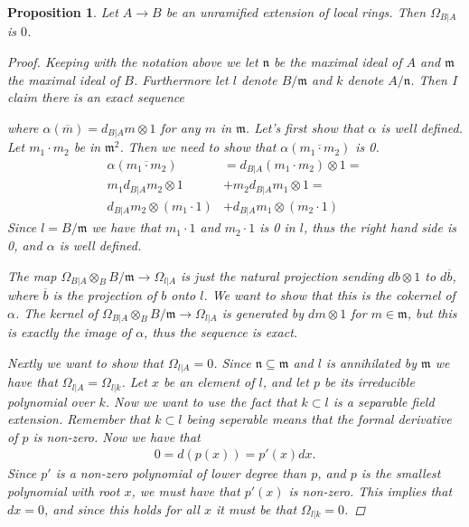 \documentclass[11pt, a4paper, english]{article}
\newtheorem{prop}{Proposition}
\numberwithin{prop}{section}
\numberwithin{lemma}{section}
\numberwithin{theorem}{section}
\numberwithin{defin}{section}
\numberwithin{example}{section}
\begin{document}
\begin{prop}
Let $A \to B$ be an unramified extension of local rings. Then $\Omega_{B|A}$ is $0$.

\begin{proof}
Keeping with the notation above we let $\mathfrak{n}$ be the maximal ideal of $A$ and $\mathfrak{m}$ the maximal ideal of $B$. Furthermore let $l$ denote $B/\mathfrak{m}$ and $k$ denote $A/\mathfrak{n}$. Then I claim there is an exact sequence
\begin{center}
\end{center}
where $\alpha(\overline{m}) = d_{B|A}m \otimes 1$ for any $m$ in $\mathfrak{m}$. Let's first show that $\alpha$ is well defined. Let $m_1 \cdot m_2$ be in $\mathfrak{m}^2$. Then we need to show that $\alpha(\overline{m_1 \cdot m_2})$ is 0. 
\begin{align*}
\alpha(\overline{m_1 \cdot m_2}) &= d_{B|A}(m_1 \cdot m_2) \otimes 1 =\\ 
m_1 d_{B|A}m_2 \otimes 1 &+ m_2d_{B|A}m_1 \otimes 1 =\\ 
d_{B|A}m_2 \otimes (m_1 \cdot 1) &+ d_{B|A}m_1 \otimes (m_2 \cdot 1)
\end{align*}
Since $l = B/\mathfrak{m}$ we have that $m_1 \cdot 1$ and $m_2 \cdot 1$ is 0 in $l$, thus the right hand side is 0, and $\alpha$ is well defined.

The map $\Omega_{B|A} \otimes_B B/\mathfrak{m} \to \Omega_{l|A}$ is just the natural projection sending $db \otimes 1$ to $d\overline{b}$, where $\overline{b}$ is the projection of $b$ onto $l$. We want to show that this is the cokernel of $\alpha$. The kernel of $\Omega_{B|A} \otimes_B B/\mathfrak{m} \to \Omega_{l|A}$ is generated by $dm \otimes 1$ for $m \in \mathfrak{m}$, but this is exactly the image of $\alpha$, thus the sequence is exact.

Nextly we want to show that $\Omega_{l|A} = 0$. Since $\mathfrak{n} \subseteq \mathfrak{m}$ and $l$ is annihilated by $\mathfrak{m}$ we have that $\Omega_{l|A} = \Omega_{l|k}$. Let $x$ be an element of $l$, and let $p$ be its irreducible polynomial over $k$. Now we want to use the fact that $k \subset l$ is a separable field extension. Remember that $k \subset l$ being seperable means that the formal derivative of $p$ is non-zero. Now we have that 
\begin{align*}
0 = d(p(x)) = p'(x)dx.
\end{align*}
Since $p'$ is a non-zero polynomial of lower degree than $p$, and $p$ is the smallest polynomial with root $x$, we must have that $p'(x)$ is non-zero. This implies that $dx=0$, and since this holds for all $x$ it must be that $\Omega_{l|k}=0$.


\end{proof}
\end{prop}
\end{document}
